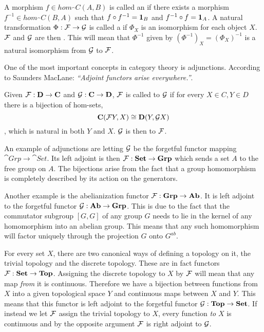 \documentclass[../../main.tex]{subfiles}
\begin{document}
    A morphism $f \in hom_\cat{C}(A, B)$ is called an  if there exists a morphism $f^{-1} \in hom_\cat{C}(B,A)$ such that $f \circ f^{-1} = \idarrow[B]$ and $f^{-1} \circ f = \idarrow[A]$. A natural transformation $\Phi: \functor{F} \to \functor{G}$ is called a  if $\Phi_X$ is an isomorphism for each object $X$. $\functor{F}$ and $\functor{G}$ are then . This will mean that $\Phi^{-1}$ given by $(\Phi^{-1})_X = (\Phi_X)^{-1}$ is a natural isomorphism from $\functor{G}$ to $\functor{F}$.
    
    One of the most important concepts in category theory is adjunctions. According to Saunders MacLane: \textit{“Adjoint functors arise everywhere.”}\cite{cate-mac}.
    
    \begin{definition}
        Given $\functor{F}: \cat{D} \to \cat{C}$ and $\functor{G}: \cat{C} \to \cat{D}$, $\functor{F}$ is called  to $\functor{G}$ if for every $X \in C, Y \in D$ there is a bijection of hom-sets, $$\cat{C}(\functor{F}Y, X) \cong \cat{D}(Y, \functor{G}X)$$, which is natural in both $Y$ and $X$. $\functor{G}$ is then  to $\functor{F}$.
    \end{definition}
    
    An example of adjunctions are letting $\functor{G}$ be the forgetful functor mapping $\cat{Grp} \to \cat{Set}$. Its left adjoint is then $\functor{F}: \cat{Set} \to \cat{Grp}$ which sends a set $A$ to the free group on $A$. The bijections arise from the fact that a group homomorphism is completely described by its action on the generators.
    
    Another example is the abelianization functor $\functor{F}: \cat{Grp} \to \cat{Ab}$. It is left adjoint to the forgetful functor $\functor{G}: \cat{Ab} \to \cat{Grp}$. This is due to the fact that the commutator subgroup $[G, G]$ of any group $G$ needs to lie in the kernel of any homomorphism into an abelian group. This means that any such homomorphism will factor uniquely through the projection $G$ onto $G^{ab}$.
    
    For every set $X$, there are two canonical ways of defining a topology on it, the trivial topology and the discrete topology. These are in fact functors $\functor{F}: \cat{Set} \to \cat{Top}$. Assigning the discrete topology to $X$ by $\functor{F}$ will mean that any map \emph{from} it is continuous. Therefore we have a bijection between functions from $X$ into a given topological space $Y$ and continuous maps between $X$ and $Y$. This means that this functor is left adjoint to the forgetful functor $\functor{G}: \cat{Top} \to \cat{Set}$. If instead we let $\functor{F}$ assign the trivial topology to $X$, every function \emph{to} $X$ is continuous and by the opposite argument $\functor{F}$ is right adjoint to $\functor{G}$.
    
\end{document}
